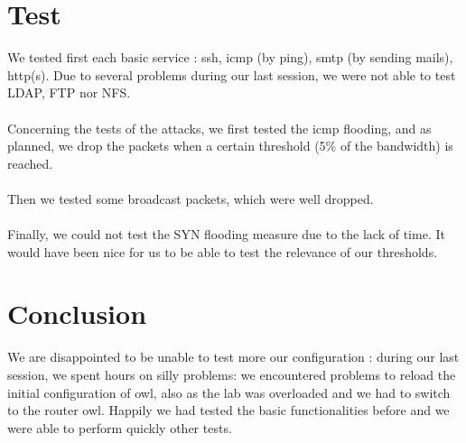 \documentclass[a4paper,titlepage]{article}
\begin{document}
\section{Test}
We tested first each basic service : ssh, icmp (by ping), smtp (by sending mails), http(s). Due to several problems during our last session, we were not able to test LDAP, FTP nor NFS.
\paragraph{}Concerning the tests of the attacks, we first tested the icmp flooding, and as planned, we drop the packets when a certain threshold (5\% of the bandwidth) is reached.

\paragraph{}Then we tested some broadcast packets, which were well dropped.
\paragraph{} Finally, we could not test the SYN flooding measure due to the lack of time. It would have been nice for us to be able to test the relevance of our thresholds.

\section{Conclusion}
We are disappointed to be unable to test more our configuration : during our last session, we spent hours on silly problems: we encountered problems to reload the initial configuration of owl, also as the lab was overloaded and we had to switch to the router owl. Happily we had tested the basic functionalities before and we were able to perform quickly other tests.
\end{document}
